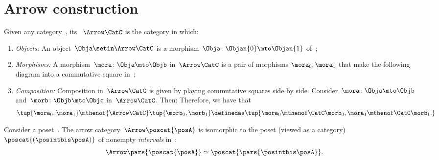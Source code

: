 
\section{Arrow construction}


\begin{ctdefinition}
    \label{def:arrow_category}
    Given any category~\CatC, its \emph{}~$\Arrow\CatC$ is the category in which:
    \begin{enumerate}
        \item \emph{Objects:} An object~$\Obja \setin \Arrow\CatC$ is a morphism~$\Obja\colon \Objan{0}\mto \Objan{1}$ of~\CatC;
        \item \emph{Morphisms:} A morphism~$\mora\colon \Obja \mto \Objb$ in~$\Arrow\CatC$ is a pair of morphisms $\mora_0,\mora_1$ that make the following diagram into a commutative square in~\CatC;
        \item \emph{Composition:} Composition in~$\Arrow \CatC$ is given by playing commutative squares side by side.
              Consider~$\mora\colon \Obja \mto \Objb$ and~$\morb\colon \Objb \mto \Objc$ in~$\Arrow\CatC$.
              Then:
              Therefore, we have that
              \begin{equation}\label{eq:arrow-cat-composition}
                  \tup{\mora_0,\mora_1} \mthenof{\Arrow \CatC} \tup{\morb_0,\morb_1}
                  \definedas \tup{\mora_0\mthenof\CatC\morb_0, \mora_1\mthenof\CatC\morb_1.
                  }
              \end{equation}
    \end{enumerate}
\end{ctdefinition}

\begin{example}[Intervals]
    \label{exa:arrow-poset}
    Consider a poset~\posA.
    The arrow category~$\Arrow \poscat{\posA}$ is isomorphic to the poset (viewed as a category)~$\poscat{\left(\posintbis\posA\right)}$ of nonempty \emph{intervals} in~\posA:
    \begin{equation}
        \Arrow \pars{\poscat{\posA}} \simeq
        \poscat{\pars{\posintbis\posA}}.
    \end{equation}
\end{example}

